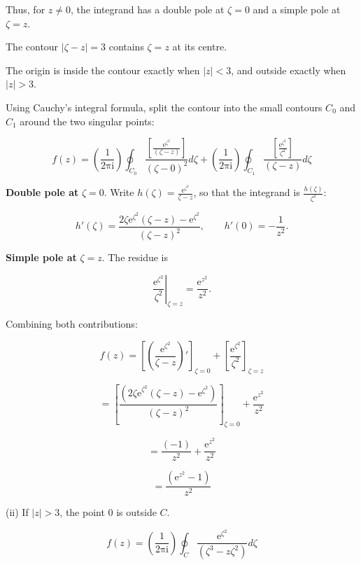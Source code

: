 \documentclass[11pt,a4paper]{article}
\theoremstyle{definition}
\theoremstyle{plain}
\begin{document}
Thus, for $z \ne 0$, the integrand has a double pole at $\zeta = 0$ and a simple pole at $\zeta = z$.

The contour $\vert{}\zeta - z\vert{} = 3$ contains $\zeta = z$ at its centre.

The origin is inside the contour exactly when $\vert{}z\vert{} < 3$, and outside exactly when $\vert{}z\vert{} > 3$.

Using Cauchy’s integral formula, split the contour into the small contours $C_{0}$ and $C_{1}$ around the two singular points:

\begin{equation}
f(z) = \left(\frac{1}{2\mathrm{\pi}\mathrm{i}}\right)\oint_{C_{0}}\frac{[\frac{\mathrm{e}^{\zeta^{2}}}{(\zeta - z)}]}{(\zeta - 0)^{2}}d\zeta + \left(\frac{1}{2\mathrm{\pi}\mathrm{i}}\right)\oint_{C_{1}}\frac{[\frac{\mathrm{e}^{\zeta^{2}}}{\zeta^{2}}]}{(\zeta - z)}d\zeta
\end{equation}

\textbf{Double pole at} $\zeta = 0$. Write $h(\zeta) = \frac{\mathrm{e}^{\zeta^{2}}}{\zeta - z}$, so that the integrand is $\frac{h(\zeta)}{\zeta^{2}}$:



\[
h'(\zeta) = \frac{2\zeta\mathrm{e}^{\zeta^{2}}(\zeta - z) - \mathrm{e}^{\zeta^{2}}}{(\zeta - z)^{2}}, \qquad h'(0) = -\frac{1}{z^{2}} .
\]



\textbf{Simple pole at} $\zeta = z$. The residue is



\[
\left.\frac{\mathrm{e}^{\zeta^{2}}}{\zeta^{2}}\right|_{\zeta = z} = \frac{\mathrm{e}^{z^{2}}}{z^{2}} .
\]



Combining both contributions:

\[
f(z) = {\left[\left(\frac{\mathrm{e}^{\zeta^{2}}}{\zeta - z}\right)'\right]}_{\zeta = 0} + {\left[\frac{\mathrm{e}^{\zeta^{2}}}{\zeta^{2}}\right]}_{\zeta = z}
\]

\[
= {[\frac{({2\zeta \mathrm{e}}^{\zeta^{2}}(\zeta - z) - \mathrm{e}^{\zeta^{2}})}{(\zeta - z)^{2}}]}_{\zeta = 0} + \frac{\mathrm{e}^{z^{2}}}{z^{2}}
\]

\[
= \frac{(-1)}{z^{2}} + \frac{\mathrm{e}^{z^{2}}}{z^{2}}
\]

\[
= \frac{(\mathrm{e}^{z^{2}} - 1)}{z^{2}}
\]

(ii) If $\vert{}z\vert{} > 3$, the point 0 is outside $C$.

\begin{equation}
f(z) = \left(\frac{1}{2\mathrm{\pi}\mathrm{i}}\right)\oint_{C}\frac{\mathrm{e}^{\zeta^{2}}}{(\zeta^{3} - z\zeta^{2})}d\zeta
\end{equation}
\end{document}
